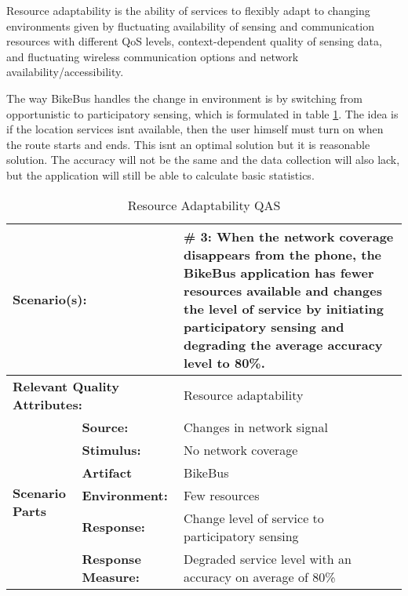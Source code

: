 \begin{defi}
Resource adaptability is the ability of services to flexibly adapt to changing environments given by fluctuating availability of sensing and communication resources with different QoS levels, context-dependent quality of sensing data, and fluctuating wireless communication options and network availability/accessibility.  
  \label{def:resource_adaptability}
\end{defi}

The way BikeBus handles the change in environment is by switching from opportunistic to participatory sensing, which is formulated in table  \ref{table:resource_adaptability_qas}. The idea is if the location services isnt available, then the user himself must turn on when the route starts and ends. This isnt an optimal solution but it is reasonable solution. The accuracy will not be the same and the data collection will also lack, but the application will still be able to calculate basic statistics.    

\begin{table}[H]
\begin{center}
\begin{tabular}{|p{0.3cm}|p{2.5cm}|p{8cm}|}
  \hline
  \multicolumn{2}{|p{3cm}|}{\bfseries Scenario(s):} & \#  3: When the network coverage disappears from the phone, the BikeBus application has fewer resources available and changes the level of service by initiating participatory sensing and degrading the average accuracy level to 80\%. \\
  \hline
  \multicolumn{2}{|p{3cm}|}{\bfseries Relevant Quality Attributes:} & Resource adaptability\\
  \hline
  \multirow{6}{*}{\begin{sideways}{\bfseries Scenario Parts}\end{sideways}}
  & {\bfseries Source:} & Changes in network signal \\
  \cline{2-3}
  & {\bfseries Stimulus:} & No network coverage  \\
  \cline{2-3}
  & {\bfseries Artifact} &  BikeBus \\
  \cline{2-3}
  & {\bfseries Environment:} &  Few resources \\
  \cline{2-3}
  & {\bfseries Response:} &  Change level of service to participatory sensing\\
  \cline{2-3}
  & {\bfseries Response Measure:} & Degraded service level with an accuracy on average of 80\%\\
  \hline
\end{tabular}
\caption{Resource Adaptability QAS}
\label{table:resource_adaptability_qas}
\end{center}
\end{table}


